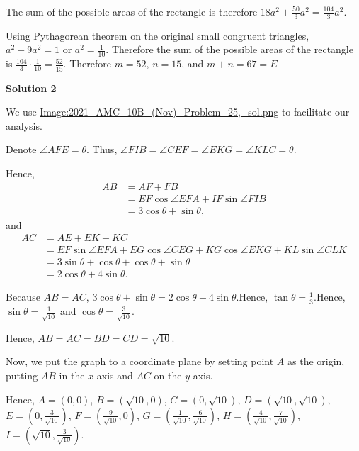 \begin{enumerate}
 The sum of the possible areas of the rectangle is therefore $18a^2+\frac{50}{3}a^2 = \frac{104}{3}a^2$.

 Using Pythagorean theorem on the original small congruent triangles, $a^2+9a^2 = 1$ or $a^2 = \frac{1}{10}$. Therefore the sum of the possible areas of the rectangle is $\frac{104}{3}\cdot\frac{1}{10} = \frac{52}{15}$. Therefore $m = 52$, $n = 15$, and $m + n = 67 = \boxed{E}$




\textbf{Solution 2}

We use \href{https://artofproblemsolving.com/wiki/index.php?title=File:2021\_AMC\_10B\_(Nov)\_Problem\_25,\_sol.png}{Image:2021\_AMC\_10B\_(Nov)\_Problem\_25,\_sol.png} to facilitate our analysis.

 Denote $\angle AFE = \theta$. Thus, $\angle FIB = \angle CEF = \angle EKG = \angle KLC = \theta$.

 Hence,
 \begin{align*} AB & = AF + FB \\ & = EF \cos \angle EFA + IF \sin \angle FIB \\ & = 3 \cos \theta + \sin \theta , \end{align*}
and
 \begin{align*} AC & = AE + EK + KC \\ & = EF \sin \angle EFA + EG \cos \angle CEG + KG \cos \angle EKG + KL \sin \angle CLK \\ & = 3 \sin \theta + \cos \theta + \cos \theta + \sin \theta \\ & = 2 \cos \theta + 4 \sin \theta . \end{align*}


 Because $AB = AC$, $3 \cos \theta + \sin \theta = 2 \cos \theta + 4 \sin \theta$.Hence, $\tan \theta = \frac{1}{3}$.Hence, $\sin \theta = \frac{1}{\sqrt{10}}$ and $\cos \theta = \frac{3}{\sqrt{10}}$.

 Hence, $AB = AC = BD = CD = \sqrt{10}$.

 Now, we put the graph to a coordinate plane by setting point $A$ as the origin, putting $AB$ in the $x$-axis and $AC$ on the $y$-axis.

 Hence, $A = \left( 0 , 0 \right)$, $B = \left( \sqrt{10} , 0 \right)$, $C = \left( 0 , \sqrt{10} \right)$, $D = \left( \sqrt{10} , \sqrt{10} \right)$, $E = \left( 0 , \frac{3}{\sqrt{10}} \right)$, $F = \left( \frac{9}{\sqrt{10}} , 0 \right)$, $G = \left( \frac{1}{\sqrt{10}} , \frac{6}{\sqrt{10}} \right)$, $H = \left( \frac{4}{\sqrt{10}} , \frac{7}{\sqrt{10}} \right)$, $I = \left( \sqrt{10} , \frac{3}{\sqrt{10}} \right)$.


\end{enumerate}
